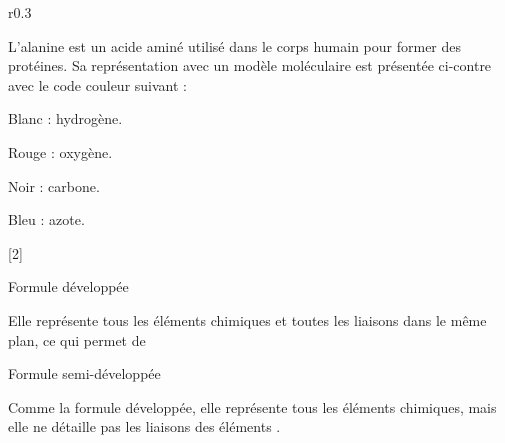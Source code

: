 \vspace*{8pt}
\begin{wrapfigure}[8]{r}{0.3\linewidth}
  \vspace*{-22pt}
\end{wrapfigure}

L'alanine est un acide aminé utilisé dans le corps humain pour former des protéines.
Sa représentation avec un modèle moléculaire est présentée ci-contre avec le code couleur suivant :
\begin{listePoints}[2]
  \item Blanc : hydrogène.
  \item Rouge : oxygène.
  \item Noir : carbone.
  \item Bleu : azote.
\end{listePoints}

\vfill
{}[2]



\newpage
\vspace*{-30pt}
\begin{doc}{Formule développée}
  \begin{importants}  
    Elle représente tous les éléments chimiques et toutes les liaisons dans le même plan, ce qui permet de 
  \end{importants}

  \exemple*
  \vspace*{-18pt}
  \begin{center}
    \qq{}
  \end{center}
\end{doc}


\begin{doc}{Formule semi-développée}
  \begin{importants}
    Comme la formule développée, elle représente tous les éléments chimiques, mais elle ne détaille pas les liaisons des éléments .
  \end{importants}

  \exemple*
  \vspace*{-8pt}
  \begin{center}
    \qq{}
  \end{center}
\end{doc}

